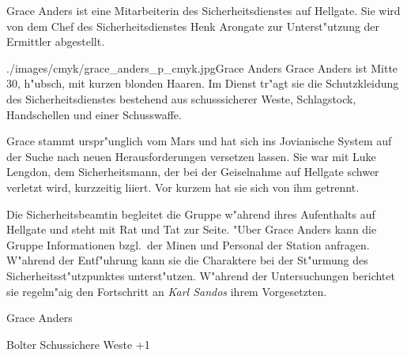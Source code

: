 
Grace Anders ist eine Mitarbeiterin des Sicherheitsdienstes auf Hellgate. Sie wird von dem Chef des Sicherheitsdienstes 
Henk Arongate zur Unterst"utzung der Ermittler abgestellt. 

\begin{sideimagebox}[l]{0.5}{./images/cmyk/grace_anders_p_cmyk.jpg}{Grace Anders}
    Grace Anders ist Mitte 30, h"ubsch, mit kurzen blonden Haaren. Im Dienst tr"agt sie die Schutzkleidung des Sicherheitsdienstes bestehend aus schusssicherer Weste, Schlagstock, Handschellen und einer Schusswaffe. 

    Grace stammt urspr"unglich vom Mars und hat sich ins Jovianische System auf der Suche nach neuen Herausforderungen 
    versetzen lassen. Sie war mit Luke Lengdon, dem Sicherheitsmann, der bei der Geiselnahme auf Hellgate schwer verletzt wird,
    kurzzeitig liiert. Vor kurzem hat sie sich von ihm getrennt.

    Die Sicherheitsbeamtin begleitet die Gruppe w"ahrend ihres Aufenthalts auf Hellgate und steht mit Rat und Tat zur Seite.
    "Uber Grace Anders kann die Gruppe Informationen bzgl.~der Minen und Personal der Station anfragen. W"ahrend der Entf"uhrung 
    kann sie die Charaktere bei der St"urmung des Sicherheitsst"utzpunktes unterst"utzen. W"ahrend der Untersuchungen berichtet 
    sie regelm"a\3ig den Fortschritt an \emph{Karl Sandos} ihrem Vorgesetzten.
\end{sideimagebox}

\begin{nscsheet}{Grace Anders}
    \nscstats[ATT=2,AGG=2,COM=2]
    \nscruler
    \begin{nscinventory}
        \nscitem[Waffen] Bolter
        \nscitem[R"ustung] Schussichere Weste +1
    \end{nscinventory}
\end{nscsheet}

